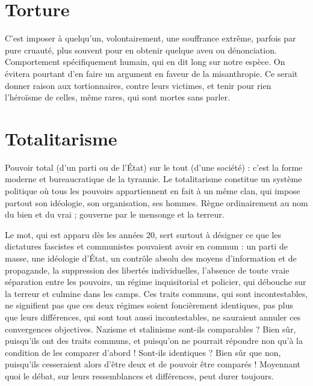 \section{Torture}
C'est imposer à quelqu'un, volontairement, une souffrance
extrême, parfois par pure cruauté, plus souvent pour en obtenir
quelque aveu ou dénonciation. Comportement spécifiquement humain, qui en
dit long sur notre espèce. On évitera pourtant d’en faire un argument en faveur
de la misanthropie. Ce serait donner raison aux tortionnaires, contre leurs victimes,
et tenir pour rien l’héroïsme de celles, même rares, qui sont mortes sans
parler.

\section{Totalitarisme}
Pouvoir total (d’un parti ou de l’État) sur le tout (d’une
société) : c’est la forme moderne et bureaucratique de la
tyrannie. Le totalitarisme constitue un système politique où tous les pouvoirs
appartiennent en fait à un même clan, qui impose partout son idéologie, son
organisation, ses hommes. Règne ordinairement au nom du bien et du vrai ;
gouverne par le mensonge et la terreur.

Le mot, qui est apparu dès les années 20, sert surtout à désigner ce que les
dictatures fascistes et communistes pouvaient avoir en commun : un parti de
masse, une idéologie d’État, un contrôle absolu des moyens d’information et de
propagande, la suppression des libertés individuelles, l’absence de toute vraie
séparation entre les pouvoirs, un régime inquisitorial et policier, qui débouche
sur la terreur et culmine dans les camps. Ces traits communs, qui sont incontestables,
ne signifient pas que ces deux régimes soient foncièrement identiques,
pas plus que leurs différences, qui sont tout aussi incontestables, ne sauraient
annuler ces convergences objectives. Nazisme et stalinisme sont-ils
comparables ? Bien sûr, puisqu'ils ont des traits communs, et puisqu’on ne
pourrait répondre non qu’à la condition de les comparer d’abord ! Sont-ils
identiques ? Bien sûr que non, puisqu'ils cesseraient alors d’être deux et de pouvoir
être comparés ! Moyennant quoi le débat, sur leurs ressemblances et différences,
peut durer toujours.

